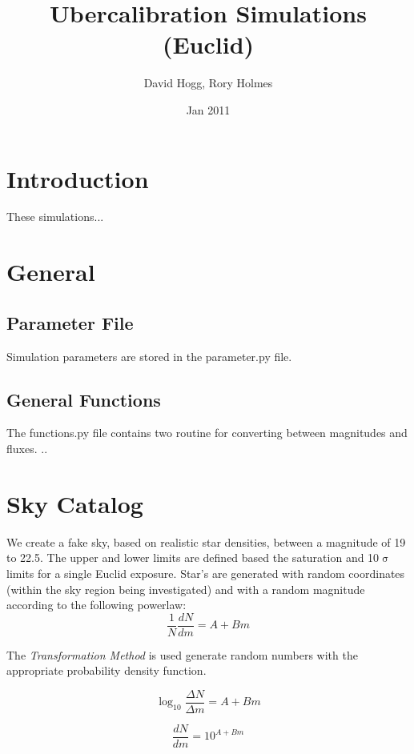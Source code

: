 \documentclass[12pt,a4paper,twoside]{article}
\author{David Hogg, Rory Holmes}
\title{Ubercalibration Simulations \\(Euclid)}
\date{Jan 2011}
\makeatletter
\def\maketitle{%
  \null
  \thispagestyle{empty}%
  \vfill
  \begin{center}\leavevmode
    \normalfont
    {\LARGE \@title\par}%
    \vskip 1cm
    {\Large \@author\par}%
    \vskip 1cm
    {\Large \@date\par}%
  \end{center}%
  \vfill
  \null
  \cleardoublepage
  }
\makeatother
\begin{document}
\maketitle

\section{Introduction}
These simulations... 

\section{General}

\subsection{Parameter File}

Simulation parameters are stored in the parameter.py file.

\subsection{General Functions}
The functions.py file contains two routine for converting between magnitudes and fluxes. ..

\section{Sky Catalog}
We create a fake sky, based on realistic star densities, between a magnitude of 19 to 22.5. The upper and lower limits are defined based the saturation and 10$\upsigma$ limits for a single Euclid exposure. Star's are generated with random coordinates (within the sky region being investigated) and with a random magnitude according to the following powerlaw:
\begin{equation}
\frac{1}{N} \frac{dN}{dm} = A + B m
\end{equation}

The \textit{Transformation Method} is used generate random numbers with the appropriate probability density function. 

\begin{equation}
\log_{10} \frac{\Delta N}{\Delta m} = A + B m
\end{equation}

\begin{equation}
\frac{d N}{d m} =10^ {A + B m}
\end{equation}
\end{document}
